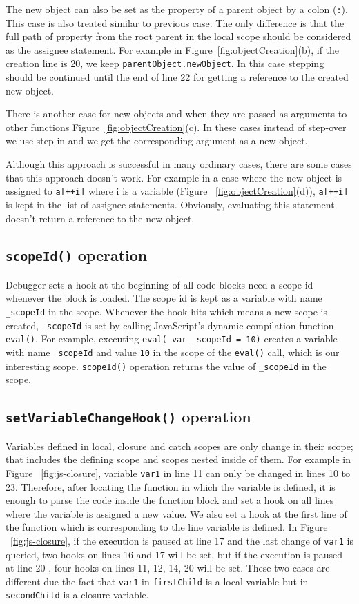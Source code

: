 \documentclass[preprint]{sigplanconf}
\begin{document}
The new object can also be set as the property of a parent object by a
colon (\texttt{:}). This case is also treated similar to previous case. The
only difference is that the full path of property from the root parent
in the local scope should be considered as the assignee statement. For
example in Figure~\ref{fig:objectCreation}(b), if the creation line
is 20, we keep \texttt{parentObject.newObject}. In this case stepping
should be continued until the end of line 22 for getting a reference
to the created new object.

There is another case for new objects and when they are passed as
arguments to other functions Figure~\ref{fig:objectCreation}(c). In these
cases instead of step-over we use step-in and we get the corresponding
argument as a new object.

Although this approach is successful in many ordinary cases, there are some 
cases that this approach doesn't work. For example in a case
where the new object is assigned to \texttt{a[++i]} where i is a variable
(Figure ~\ref{fig:objectCreation}(d)), \texttt{a[++i]} is kept in the list
of assignee statements. Obviously, evaluating this statement doesn't return
a reference to the new object.

\subsection{\texttt{scopeId()} operation}
Debugger sets a hook at the beginning of all code blocks need
a scope id whenever the block is loaded. The scope id is kept as a variable with name 
\texttt{\_scopeId} in the scope. Whenever the hook hits which means a new scope
is created, \texttt{\_scopeId} is set by calling JavaScript's dynamic compilation 
function \texttt{eval()}. For example, executing \texttt{eval( var \_scopeId = 10)} creates a
variable with name \texttt{\_scopeId} and value \texttt{10} in the
scope of the \texttt{eval()} call, which is our interesting scope. \texttt{scopeId()}
operation returns the value of \texttt{\_scopeId} in the scope.

\subsection{\texttt{setVariableChangeHook()} operation}
Variables defined in local, closure and catch scopes are only change in
their scope; that includes the defining scope and scopes nested inside of them.
For example in Figure ~\ref{fig:js-closure}, variable \texttt{var1} in line 11 can only be
changed in lines 10 to 23. Therefore, after locating the function in
which the variable is defined, it is enough to parse the code inside
the function block and set a hook on all lines where the variable is
assigned a new value. 
We also set a hook at the first line of the function which is
corresponding to the line variable is defined. In Figure
~\ref{fig:js-closure}, if the execution is paused at line 17 and the
last change of \texttt{var1} is queried, two hooks on lines 16 and 17
will be set, but if the execution is paused at line 20 , four hooks on
lines 11, 12, 14, 20 will be set. These two cases are different due
the fact that \texttt{var1} in \texttt{firstChild} is a local variable
but in \texttt{secondChild} is a closure variable.
\end{document}
